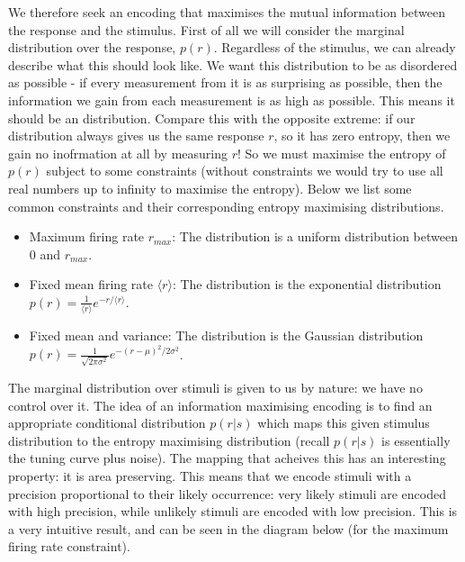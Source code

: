 \documentclass{article}
\begin{document}
We therefore seek an encoding that maximises the mutual information between the response and the stimulus. First of all we will consider the marginal distribution over the response, $p(r)$. Regardless of the stimulus, we can already describe what this should look like. We want this distribution to be as disordered as possible - if every measurement from it is as surprising as possible, then the information we gain from each measurement is as high as possible. This means it should be an  distribution. Compare this with the opposite extreme: if our distribution always gives us the same response $r$, so it has zero entropy, then we gain no inofrmation at all by measuring $r$! So we must maximise the entropy of $p(r)$ subject to some constraints (without constraints we would try to use all real numbers up to infinity to maximise the entropy). Below we list some common constraints and their corresponding entropy maximising distributions.

\begin{itemize}
	\item Maximum firing rate $r_{max}$: The distribution is a uniform distribution between 0 and $r_{max}$.
	\item Fixed mean firing rate $\langle r \rangle$: The distribution is the exponential distribution $p(r) = \frac{1}{\langle r \rangle}e^{-r/\langle r \rangle}$.
	\item Fixed mean and variance: The distribution is the Gaussian distribution $p(r) = \frac{1}{\sqrt{2\pi\sigma^2}}e^{-(r-\mu)^2/2\sigma^2}$.
\end{itemize}

The marginal distribution over stimuli is given to us by nature: we have no control over it. The idea of an information maximising encoding is to find an appropriate conditional distribution $p(r|s)$ which maps this given stimulus distribution to the entropy maximising distribution (recall $p(r|s)$ is essentially the tuning curve plus noise). The mapping that acheives this has an interesting property: it is area preserving. This means that we encode stimuli with a precision proportional to their likely occurrence: very likely stimuli are encoded with high precision, while unlikely stimuli are encoded with low precision. This is a very intuitive result, and can be seen in the diagram below (for the maximum firing rate constraint).
\end{document}
